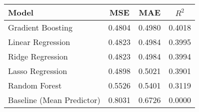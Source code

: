\begin{tabular}{lccc}
\toprule
\textbf{Model} & \textbf{MSE} & \textbf{MAE} & \textbf{$R^2$} \\
\midrule
Gradient Boosting         & 0.4804 & 0.4980 & 0.4018 \\
Linear Regression         & 0.4823 & 0.4984 & 0.3995 \\
Ridge Regression          & 0.4823 & 0.4984 & 0.3994 \\
Lasso Regression          & 0.4898 & 0.5021 & 0.3901 \\
Random Forest             & 0.5526 & 0.5401 & 0.3119 \\
Baseline (Mean Predictor) & 0.8031 & 0.6726 & 0.0000 \\
\bottomrule
\end{tabular}
